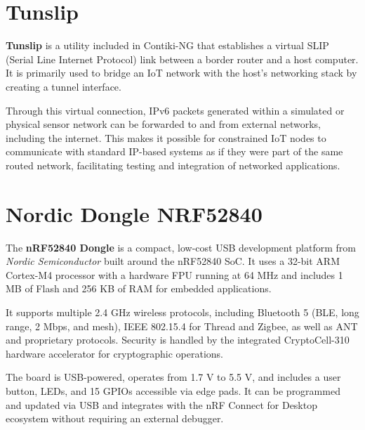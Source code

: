 \section{Tunslip}
\textbf{Tunslip} is a utility included in Contiki-NG that establishes a virtual SLIP (Serial Line Internet Protocol) link between a border router and a host computer. It is primarily used to bridge an IoT network with the host's networking stack by creating a tunnel interface.

Through this virtual connection, IPv6 packets generated within a simulated or physical sensor network can be forwarded to and from external networks, including the internet. This makes it possible for constrained IoT nodes to communicate with standard IP-based systems as if they were part of the same routed network, facilitating testing and integration of networked applications.

\section{Nordic Dongle NRF52840}
The \textbf{nRF52840 Dongle} is a compact, low-cost USB development platform from \textit{Nordic Semiconductor} built around the nRF52840 SoC. It uses a 32-bit ARM Cortex-M4 processor with a hardware FPU running at 64 MHz and includes 1 MB of Flash and 256 KB of RAM for embedded applications.

It supports multiple 2.4 GHz wireless protocols, including Bluetooth 5 (BLE, long range, 2 Mbps, and mesh), IEEE 802.15.4 for Thread and Zigbee, as well as ANT and proprietary protocols. Security is handled by the integrated CryptoCell-310 hardware accelerator for cryptographic operations.

The board is USB-powered, operates from 1.7 V to 5.5 V, and includes a user button, LEDs, and 15 GPIOs accessible via edge pads. It can be programmed and updated via USB and integrates with the nRF Connect for Desktop ecosystem without requiring an external debugger.
